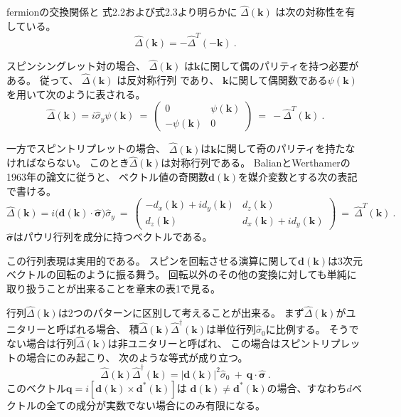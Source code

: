 \documentclass[uplatex,a4j,12pt,dvipdfmx]{jsarticle}
\begin{document}
fermionの交換関係と
式2.2および式2.3より明らかに
$\hat{\Delta}(\bm{k})$
は次の対称性を有している。
\[
	\hat{\Delta}(\bm{k})
	=
	- \hat{\Delta}^{T}(-\bm{k})
	\ .
\]

スピンシングレット対の場合、
$\hat{\Delta}(\bm{k})$
は$\bm{k}$に関して偶のパリティを持つ必要がある。
従って、
$\hat{\Delta}(\bm{k})$
は反対称行列
であり、
$\bm{k}$に関して偶関数である$\psi(\bm{k})$を用いて次のように表される。
\[
	\hat{\Delta}(\bm{k})
	=
	i \hat{\sigma}_{y} \psi(\bm{k})
	\ = \
	\left(
	\begin{array}{cc}
			0              & \psi(\bm{k}) \\
			- \psi(\bm{k}) & 0
		\end{array}
	\right)
	\ = \
	- \hat{\Delta}^{T}(\bm{k})
	\ .
\]

一方でスピントリプレットの場合、
$\hat{\Delta}(\bm{k})$は$\bm{k}$に関して奇のパリティを持たなければならない。
このとき$\hat{\Delta}(\bm{k})$は対称行列である。
BalianとWerthamerの1963年の論文に従うと、
ベクトル値の奇関数$\bm{d}(\bm{k})$を媒介変数とする次の表記で書ける。
\[
	\hat{\Delta}(\bm{k})
	=
	i \Big( \bm{d}(\bm{k}) \cdot \hat{\bm{\sigma}} \Big) \hat{\sigma}_{y}
	\ = \
	\left(
	\begin{array}{cc}
			- d_{x}(\bm{k}) + i d_{y}(\bm{k}) & d_{z}(\bm{k})                   \\
			d_{z}(\bm{k})                     & d_{x}(\bm{k}) + i d_{y}(\bm{k})
		\end{array}
	\right)
	\ = \
	\hat{\Delta}^{T}(\bm{k})
	\ .
\]
$\hat{\bm{\sigma}}$はパウリ行列を成分に持つベクトルである。

この行列表現は実用的である。
スピンを回転させる演算に関して$\bm{d}(\bm{k})$は3次元ベクトルの回転のように振る舞う。
回転以外のその他の変換に対しても単純に取り扱うことが出来ることを章末の表1で見る。

行列$\hat{\Delta}(\bm{k})$は2つのパターンに区別して考えることが出来る。
まず$\hat{\Delta}(\bm{k})$がユニタリーと呼ばれる場合、
積$\hat{\Delta}(\bm{k}) \hat{\Delta}^{\dagger}(\bm{k})$は単位行列$\hat{\sigma}_{0}$に比例する。
そうでない場合は行列$\hat{\Delta}(\bm{k})$は非ユニタリーと呼ばれ、
この場合はスピントリプレットの場合にのみ起こり、
次のような等式が成り立つ。
\[
	\hat{\Delta}(\bm{k}) \hat{\Delta}^{\dagger}(\bm{k})
	=
	|\bm{d}(\bm{k})|^{2} \hat{\sigma}_{0}
	\ + \
	\bm{q} \cdot \hat{\bm{\sigma}}
	\ .
\]
このベクトル$\bm{q}=i [ \bm{d}(\bm{k}) \times \bm{d}^{*}(\bm{k}) ]$は
$\bm{d}(\bm{k}) \neq \bm{d}^{*}(\bm{k})$の場合、すなわち$d$ベクトルの全ての成分が実数でない場合にのみ有限になる。
\end{document}
